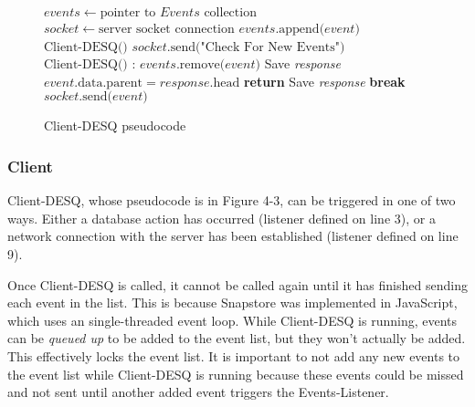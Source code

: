 \begin{center}
\begin{figure}[ht]
\begin{algorithmic}[1]
\State $events \gets \text{pointer to }Events \text{ collection}$
\State $socket \gets \text{server socket connection}$
\State $events\text{.append(}event\text{)}$
\EndWhile
\EndFunction
{}
\State $\text{Client-DESQ()}$
\EndWhile
\EndFunction
{}
\State $socket\text{.send("Check For New Events")}$
\State $\text{Client-DESQ()}$
\EndWhile
\EndFunction
{}
:
\State $events\text{.remove(}event\text{)}$
 
\State Save \emph{response} 
\State $event\text{.data.parent} = response\text{.head}$
\EndIf
\Else {}
\State \textbf{return}
\EndIf
\State Save \emph{response}
\EndIf
\EndWhile
\EndFunction
{}
\State \textbf{break}
\EndIf
\State $socket\text{.send(}event\text{)}$
\EndFor
\EndProcedure
\end{algorithmic}
\caption{Client-DESQ pseudocode}\label{euclid}
\end{figure}
\end{center}

\subsubsection{Client}

Client-DESQ, whose pseudocode is in Figure 4-3, can be triggered in one of two ways. Either a database action has occurred (listener defined on line 3), or a network connection with the server has been established (listener defined on line 9). 

Once Client-DESQ is called, it cannot be called again until it has finished sending each event in the list. This is because Snapstore was implemented in JavaScript, which uses an single-threaded event loop. While Client-DESQ is running, events can be \textit{queued up} to be added to the event list, but they won't actually be added. This effectively locks the event list. It is important to not add any new events to the event list while Client-DESQ is running because these events could be missed and not sent until another added event triggers the Events-Listener.


